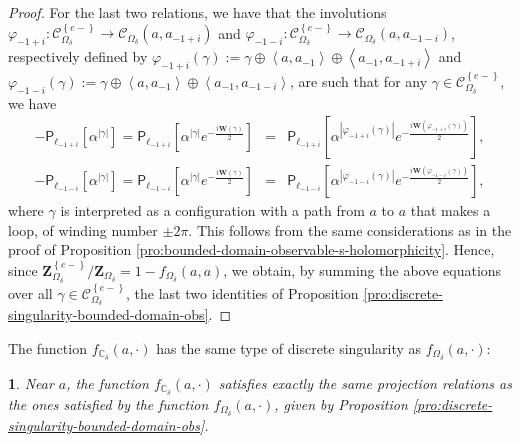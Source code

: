 \documentclass[oneside,english]{amsart}
\numberwithin{equation}{section}
\numberwithin{figure}{section}
\theoremstyle{plain}
\theoremstyle{plain}
\theoremstyle{plain}
\theoremstyle{plain}
\newtheorem{prop}[thm]{\protect\propositionname}
\theoremstyle{plain}
\theoremstyle{definition}
\theoremstyle{remark}
\providecommand{\propositionname}{Proposition}
\begin{document}
\begin{proof}
For the last two relations, we have that the involutions $\varphi_{-1+i}:\mathcal{C}_{\Omega_{\delta}}^{\left\{ e-\right\} }\to\mathcal{C}_{\Omega_{\delta}}\left(a,a_{-1+i}\right)$
and $\varphi_{-1-i}:\mathcal{C}_{\Omega_{\delta}}^{\left\{ e-\right\} }\to\mathcal{C}_{\Omega_{\delta}}\left(a,a_{-1-i}\right)$,
respectively defined by $\varphi_{-1+i}\left(\gamma\right):=\gamma\oplus\left\langle a,a_{-1}\right\rangle \oplus\left\langle a_{-1},a_{-1+i}\right\rangle $
and $\varphi_{-1-i}\left(\gamma\right):=\gamma\oplus\left\langle a,a_{-1}\right\rangle \oplus\left\langle a_{-1},a_{-1-i}\right\rangle $,
are such that for any $\gamma\in\mathcal{C}_{\Omega_{\delta}}^{\left\{ e-\right\} }$,
we have
\begin{eqnarray*}
-\mathsf{P}_{\ell_{-1+i}}\left[\alpha^{\left|\gamma\right|}\right]=\mathsf{P}_{\ell_{-1+i}}\left[\alpha^{\left|\gamma\right|}e^{-\frac{i\mathbf{W}\left(\gamma\right)}{2}}\right] & = & \mathsf{P}_{\ell_{-1+i}}\left[\alpha^{\left|\varphi_{-1+i}\left(\gamma\right)\right|}e^{-\frac{i\mathbf{W}\left(\varphi_{-1+i}\left(\gamma\right)\right)}{2}}\right],\\
-\mathsf{P}_{\ell_{-1-i}}\left[\alpha^{\left|\gamma\right|}\right]=\mathsf{P}_{\ell_{-1-i}}\left[\alpha^{\left|\gamma\right|}e^{-\frac{i\mathbf{W}\left(\gamma\right)}{2}}\right] & = & \mathsf{P}_{\ell_{-1-i}}\left[\alpha^{\left|\varphi_{-1-i}\left(\gamma\right)\right|}e^{-\frac{i\mathbf{W}\left(\varphi_{-1-i}\left(\gamma\right)\right)}{2}}\right],
\end{eqnarray*}
where $\gamma$ is interpreted as a configuration with a path from
$a$ to $a$ that makes a loop, of winding number $\pm2\pi$. This
follows from the same considerations as in the proof of Proposition
\ref{pro:bounded-domain-observable-s-holomorphicity}. Hence, since
$\mathbf{Z}_{\Omega_{\delta}}^{\left\{ e-\right\} }/\mathbf{Z}_{\Omega_{\delta}}=1-f_{\Omega_{\delta}}\left(a,a\right)$,
we obtain, by summing the above equations over all $\gamma\in\mathcal{C}_{\Omega_{\delta}}^{\left\{ e-\right\} }$,
the last two identities of Proposition \ref{pro:discrete-singularity-bounded-domain-obs}.
\end{proof}
The function $f_{\mathbb{C}_{\delta}}\left(a,\cdot\right)$ has the
same type of discrete singularity as $f_{\Omega_{\delta}}\left(a,\cdot\right)$:
\begin{prop}
\label{pro:full-plane-observable-singularity}Near $a$, the function
$f_{\mathbb{C}_{\delta}}\left(a,\cdot\right)$ satisfies exactly the
same projection relations as the ones satisfied by the function $f_{\Omega_{\delta}}\left(a,\cdot\right)$,
given by Proposition \ref{pro:discrete-singularity-bounded-domain-obs}.\end{prop}
\end{document}
